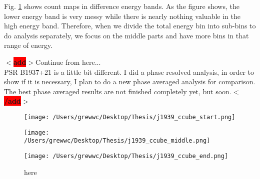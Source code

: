 \documentclass[12pt]{report}
\newcommand{\mycaption}[1]{\protect \caption{#1}}
\newcommand{\add}[1]{
  $<$\colorbox{red}{\textbf{add}}$>$#1$<$\colorbox{red}{\textbf{/add}}$>$
}
\begin{document}
          Fig. \ref{fig: j1939_count_cube} shows count maps in difference energy bands. As 
          the figure shows, the lower energy band is very messy while there is nearly nothing 
          valuable in the high energy band. Therefore, when we divide the total energy bin into 
          sub-bins to do analysis separately, we focus on the middle parts and have more bins
          in that range of energy.

          \add{Continue from here... \\
            PSR B1937+21 is a little bit different. I did a phase resolved analysis, 
            in order to show if it is necessary, I plan to do a new phase averaged analysis for 
            comparison. The best phase averaged results are not finished completely yet, but soon.}
          \begin{figure}[!ht]
            \begin{minipage}{0.32\textwidth}
              \begin{center} 
                \texttt{[image: /Users/grewwc/Desktop/Thesis/j1939\_ccube\_start.png]}
              \end{center}
            \end{minipage}
            \begin{minipage}{0.32\textwidth}
              \begin{center}
                \texttt{[image: /Users/grewwc/Desktop/Thesis/j1939\_ccube\_middle.png]}
              \end{center}
            \end{minipage}
            \begin{minipage}{0.32\textwidth}
              \begin{center}
              \texttt{[image: /Users/grewwc/Desktop/Thesis/j1939\_ccube\_end.png]}
              \end{center}
            \end{minipage}
            \caption{here}
            
            \label{fig: j1939_count_cube}
          \end{figure}
          \vspace{0.5cm}
\end{document}
